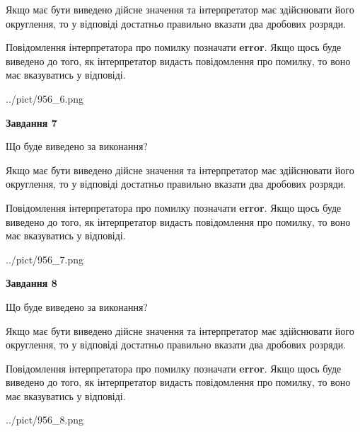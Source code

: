\documentclass[12pt, ukrainian]{article}
\begin{document}
{\begin {Large}
Якщо має бути виведено дійсне значення та інтерпретатор має здійснювати його округлення, 
то у відповіді достатньо правильно вказати два дробових розряди.

Повідомлення інтерпретатора про помилку позначати \textbf{error}.
Якщо щось буде виведено до того, як інтерпретатор видасть повідомлення про помилку, 
то воно має вказуватись у відповіді. \par

\begin{center}
	{../pict/956_6.png}
\end{center}
\newpage

{\begin {center}\textbf{Завдання 7}\end {center}}\par
Що буде виведено за виконання? \par

Якщо має бути виведено дійсне значення та інтерпретатор має здійснювати його округлення, 
то у відповіді достатньо правильно вказати два дробових розряди.

Повідомлення інтерпретатора про помилку позначати \textbf{error}.
Якщо щось буде виведено до того, як інтерпретатор видасть повідомлення про помилку, 
то воно має вказуватись у відповіді. \par

\begin{center}
	{../pict/956_7.png}
\end{center}
\newpage

{\begin {center}\textbf{Завдання 8}\end {center}}\par
Що буде виведено за виконання? \par

Якщо має бути виведено дійсне значення та інтерпретатор має здійснювати його округлення, 
то у відповіді достатньо правильно вказати два дробових розряди.

Повідомлення інтерпретатора про помилку позначати \textbf{error}.
Якщо щось буде виведено до того, як інтерпретатор видасть повідомлення про помилку, 
то воно має вказуватись у відповіді. \par

\begin{center}
	{../pict/956_8.png}
\end{center}
\newpage


\end{Large}}
\end{document}
